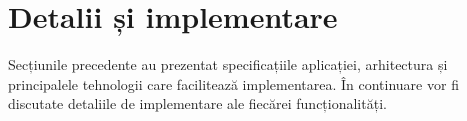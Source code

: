 \chapter{Detalii și implementare}\label{implementation}

Secțiunile precedente au prezentat specificațiile aplicației, arhitectura și principalele tehnologii care facilitează implementarea. În continuare vor fi discutate detaliile de implementare ale fiecărei funcționalități.







